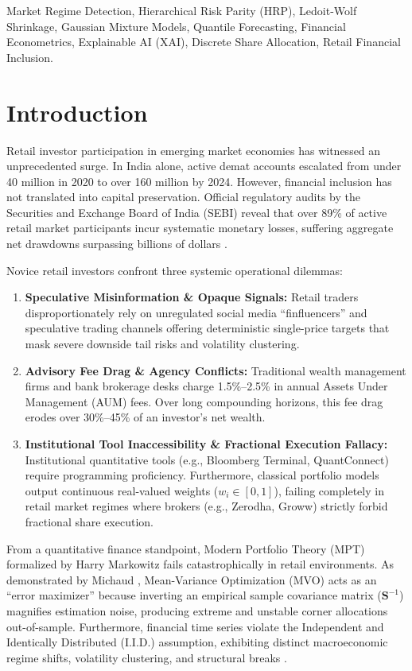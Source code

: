 \documentclass[conference]{IEEEtran}
\begin{document}
\begin{IEEEkeywords}
Market Regime Detection, Hierarchical Risk Parity (HRP), Ledoit-Wolf Shrinkage, Gaussian Mixture Models, Quantile Forecasting, Financial Econometrics, Explainable AI (XAI), Discrete Share Allocation, Retail Financial Inclusion.
\end{IEEEkeywords}

\section{Introduction}
Retail investor participation in emerging market economies has witnessed an unprecedented surge. In India alone, active demat accounts escalated from under 40 million in 2020 to over 160 million by 2024. However, financial inclusion has not translated into capital preservation. Official regulatory audits by the Securities and Exchange Board of India (SEBI) reveal that over 89\% of active retail market participants incur systematic monetary losses, suffering aggregate net drawdowns surpassing billions of dollars \cite{sebi2023study}.

Novice retail investors confront three systemic operational dilemmas:
\begin{enumerate}
    \item \textbf{Speculative Misinformation \& Opaque Signals:} Retail traders disproportionately rely on unregulated social media ``finfluencers'' and speculative trading channels offering deterministic single-price targets that mask severe downside tail risks and volatility clustering.
    \item \textbf{Advisory Fee Drag \& Agency Conflicts:} Traditional wealth management firms and bank brokerage desks charge 1.5\%--2.5\% in annual Assets Under Management (AUM) fees. Over long compounding horizons, this fee drag erodes over 30\%--45\% of an investor's net wealth.
    \item \textbf{Institutional Tool Inaccessibility \& Fractional Execution Fallacy:} Institutional quantitative tools (e.g., Bloomberg Terminal, QuantConnect) require programming proficiency. Furthermore, classical portfolio models output continuous real-valued weights ($w_i \in [0, 1]$), failing completely in retail market regimes where brokers (e.g., Zerodha, Groww) strictly forbid fractional share execution.
\end{enumerate}

From a quantitative finance standpoint, Modern Portfolio Theory (MPT) formalized by Harry Markowitz \cite{markowitz1952portfolio} fails catastrophically in retail environments. As demonstrated by Michaud \cite{michaud1989markowitz}, Mean-Variance Optimization (MVO) acts as an ``error maximizer'' because inverting an empirical sample covariance matrix ($\mathbf{S}^{-1}$) magnifies estimation noise, producing extreme and unstable corner allocations out-of-sample. Furthermore, financial time series violate the Independent and Identically Distributed (I.I.D.) assumption, exhibiting distinct macroeconomic regime shifts, volatility clustering, and structural breaks \cite{cont2001empirical, hamilton1989new}.
\end{document}
